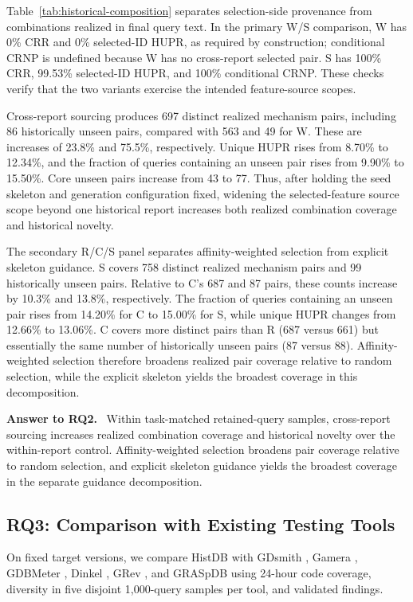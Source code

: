 \documentclass[acmsmall,screen,anonymous]{acmart}
\newcommand{\cnpara}[1]{\par\noindent\textbf{#1.}\ }
\begin{document}
Table~\ref{tab:historical-composition} separates selection-side provenance from combinations realized in final query text. In the primary W/S comparison, W has 0\% CRR and 0\% selected-ID HUPR, as required by construction; conditional CRNP is undefined because W has no cross-report selected pair. S has 100\% CRR, 99.53\% selected-ID HUPR, and 100\% conditional CRNP. These checks verify that the two variants exercise the intended feature-source scopes.

Cross-report sourcing produces 697 distinct realized mechanism pairs, including 86 historically unseen pairs, compared with 563 and 49 for W. These are increases of 23.8\% and 75.5\%, respectively. Unique HUPR rises from 8.70\% to 12.34\%, and the fraction of queries containing an unseen pair rises from 9.90\% to 15.50\%. Core unseen pairs increase from 43 to 77. Thus, after holding the seed skeleton and generation configuration fixed, widening the selected-feature source scope beyond one historical report increases both realized combination coverage and historical novelty.

The secondary R/C/S panel separates affinity-weighted selection from explicit skeleton guidance. S covers 758 distinct realized mechanism pairs and 99 historically unseen pairs. Relative to C's 687 and 87 pairs, these counts increase by 10.3\% and 13.8\%, respectively. The fraction of queries containing an unseen pair rises from 14.20\% for C to 15.00\% for S, while unique HUPR changes from 12.66\% to 13.06\%. C covers more distinct pairs than R (687 versus 661) but essentially the same number of historically unseen pairs (87 versus 88). Affinity-weighted selection therefore broadens realized pair coverage relative to random selection, while the explicit skeleton yields the broadest coverage in this decomposition.

\cnpara{Answer to RQ2}
Within task-matched retained-query samples, cross-report sourcing increases realized combination coverage and historical novelty over the within-report control. Affinity-weighted selection broadens pair coverage relative to random selection, and explicit skeleton guidance yields the broadest coverage in the separate guidance decomposition.

\subsection{RQ3: Comparison with Existing Testing Tools}
\label{sec:rq3}

On fixed target versions, we compare HistDB with GDsmith \cite{ref3}, Gamera \cite{ref5}, GDBMeter \cite{ref4}, Dinkel \cite{ref7}, GRev \cite{refGRev}, and GRASpDB \cite{ref17} using 24-hour code coverage, diversity in five disjoint 1,000-query samples per tool, and validated findings.
\end{document}
